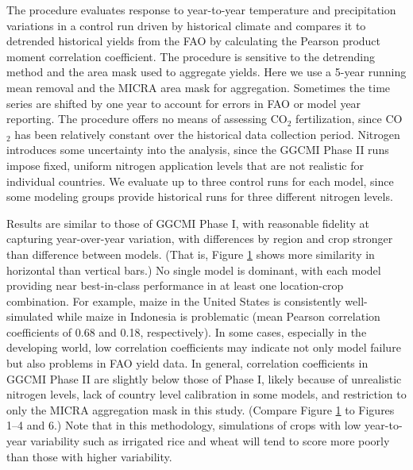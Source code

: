 \documentclass[esd, manuscript]{copernicus} %
\begin{document}
\begin{figure}[t]
    \label{fig:simulation_val}
\end{figure}

The \citet{muller_global_2017} procedure evaluates response to year-to-year temperature and precipitation variations in a control run driven by historical climate and compares it to detrended historical yields from the FAO \citep{FAOSTAT} by calculating the Pearson product moment correlation coefficient. The procedure is sensitive to the detrending method and the area mask used to aggregate yields. Here we use a 5-year running mean removal and the MICRA area mask for aggregation. Sometimes the time series are shifted by one year to account for errors in FAO or model year reporting. The procedure offers no means of assessing CO$_2$ fertilization, since CO$_2$ has been relatively constant over the historical data collection period. Nitrogen introduces some uncertainty into the analysis, since the GGCMI Phase II runs impose fixed, uniform nitrogen application levels that are not realistic for individual countries. We evaluate up to three control runs for each model, since some modeling groups provide historical runs for three different nitrogen levels. 

Results are similar to those of GGCMI Phase I, with reasonable fidelity at capturing year-over-year variation, with differences by region and crop stronger than difference between models. (That is, Figure \ref{fig:simulation_val} shows more similarity in horizontal than vertical bars.) No single model is dominant, with each model providing near best-in-class performance in at least one location-crop combination. For example, maize in the United States is consistently well-simulated while maize in Indonesia is problematic (mean Pearson correlation coefficients of 0.68 and 0.18, respectively). In some cases, especially in the developing world, low correlation coefficients may indicate not only model failure but also problems in FAO yield data. 
In general, correlation coefficients in GGCMI Phase II are slightly below those of Phase I, likely because of unrealistic nitrogen levels, lack of country level calibration in some models, and restriction to only the MICRA aggregation mask in this study. (Compare Figure \ref{fig:simulation_val} to \citet{muller_global_2017} Figures 1--4 and 6.) Note that in this methodology, simulations of crops with low year-to-year variability such as irrigated rice and wheat will tend to score more poorly than those with higher variability.
\end{document}
